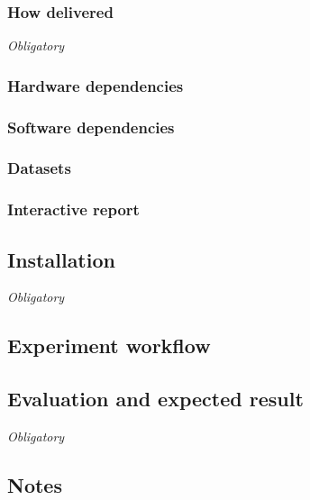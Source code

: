 \documentclass{sigplanconf}
\begin{document}
\subsubsection{How delivered}

{\em Obligatory}

\subsubsection{Hardware dependencies}

\subsubsection{Software dependencies}

\subsubsection{Datasets}

\subsubsection{Interactive report}

\subsection{Installation}

{\em Obligatory}

\subsection{Experiment workflow}

\subsection{Evaluation and expected result}

{\em Obligatory}

\subsection{Notes}

\end{document}
